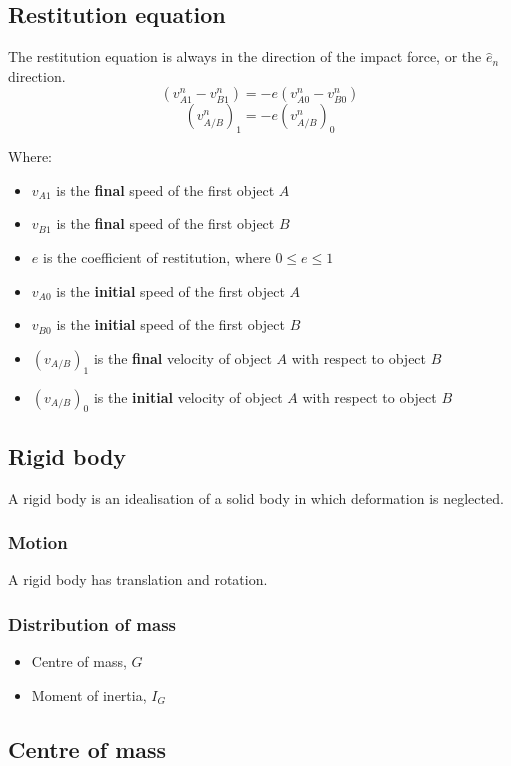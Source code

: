 \documentclass[11pt]{article}
\begin{document}
\subsection{Restitution equation}
\label{sec:org3947e0e}
The restitution equation is always in the direction of the impact force, or the \(\hat{e}_n\) direction.
\[(v_{A1}^n - v_{B1}^n) = - e(v_{A0}^n - v_{B0}^n)\]
\[(v_{A/B}^n)_1 = -e (v_{A/B}^n)_0\]

Where:
\begin{itemize}
\item \(v_{A1}\) is the \textbf{final} speed of the first object \(A\)
\item \(v_{B1}\) is the \textbf{final} speed of the first object \(B\)
\item \(e\) is the coefficient of restitution, where \(0 \le e \le 1\)
\item \(v_{A0}\) is the \textbf{initial} speed of the first object \(A\)
\item \(v_{B0}\) is the \textbf{initial} speed of the first object \(B\)
\item \((v_{A/B})_1\) is the \textbf{final} velocity of object \(A\) with respect to object \(B\)
\item \((v_{A/B})_0\) is the \textbf{initial} velocity of object \(A\) with respect to object \(B\)
\end{itemize}

\subsection{Rigid body}
\label{sec:orgf7c28ef}
A rigid body is an idealisation of a solid body in which deformation is neglected.

\subsubsection{Motion}
\label{sec:org7ae137f}
A rigid body has translation and rotation.

\subsubsection{Distribution of mass}
\label{sec:orgc39c4ac}
\begin{itemize}
\item Centre of mass, \(G\)
\item Moment of inertia, \(I_G\)
\end{itemize}

\subsection{Centre of mass}
\label{sec:org2b7c3cd}
\end{document}
